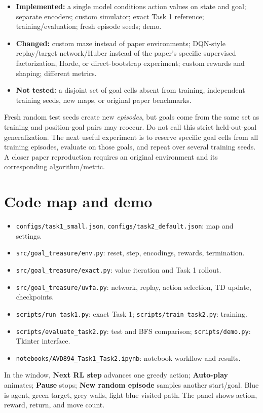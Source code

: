 \documentclass[11pt,a4paper]{article}
\begin{document}
\begin{itemize}
\item \textbf{Implemented:} a single model conditions action values on state and goal; separate encoders; custom simulator; exact Task 1 reference; training/evaluation; fresh episode seeds; demo.
\item \textbf{Changed:} custom maze instead of paper environments; DQN-style replay/target network/Huber instead of the paper's specific supervised factorization, Horde, or direct-bootstrap experiment; custom rewards and shaping; different metrics.
\item \textbf{Not tested:} a disjoint set of goal cells absent from training, independent training seeds, new maps, or original paper benchmarks.
\end{itemize}
Fresh random test seeds create new \emph{episodes}, but goals come from the same set as training and position-goal pairs may reoccur. Do not call this strict held-out-goal generalization. The next useful experiment is to reserve specific goal cells from all training episodes, evaluate on those goals, and repeat over several training seeds. A closer paper reproduction requires an original environment and its corresponding algorithm/metric.

\section{Code map and demo}
\begin{itemize}
\item \texttt{configs/task1\_small.json}, \texttt{configs/task2\_default.json}: map and settings.
\item \texttt{src/goal\_treasure/env.py}: reset, step, encodings, rewards, termination.
\item \texttt{src/goal\_treasure/exact.py}: value iteration and Task 1 rollout.
\item \texttt{src/goal\_treasure/uvfa.py}: network, replay, action selection, TD update, checkpoints.
\item \texttt{scripts/run\_task1.py}: exact Task 1; \texttt{scripts/train\_task2.py}: training.
\item \texttt{scripts/evaluate\_task2.py}: test and BFS comparison; \texttt{scripts/demo.py}: Tkinter interface.
\item \texttt{notebooks/AVD894\_Task1\_Task2.ipynb}: notebook workflow and results.
\end{itemize}
In the window, \textbf{Next RL step} advances one greedy action; \textbf{Auto-play} animates; \textbf{Pause} stops; \textbf{New random episode} samples another start/goal. Blue is agent, green target, grey walls, light blue visited path. The panel shows action, reward, return, and move count.
\end{document}
